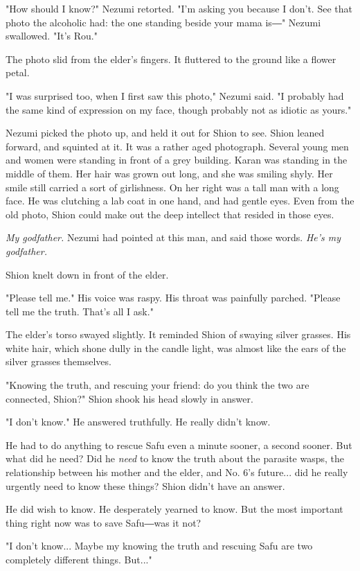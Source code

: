 "How should I know?" Nezumi retorted. "I'm asking you because I don't.
See that photo the alcoholic had: the one standing beside your mama is―"
Nezumi swallowed. "It's Rou."

The photo slid from the elder's fingers. It fluttered to the ground like
a flower petal.

"I was surprised too, when I first saw this photo," Nezumi said. "I
probably had the same kind of expression on my face, though probably not
as idiotic as yours."

Nezumi picked the photo up, and held it out for Shion to see. Shion
leaned forward, and squinted at it. It was a rather aged photograph.
Several young men and women were standing in front of a grey building.
Karan was standing in the middle of them. Her hair was grown out long,
and she was smiling shyly. Her smile still carried a sort of
girlishness. On her right was a tall man with a long face. He was
clutching a lab coat in one hand, and had gentle eyes. Even from the old
photo, Shion could make out the deep intellect that resided in those
eyes.

\emph{My godfather.} Nezumi had pointed at this man, and said those words. \emph{He's
	my godfather.}

Shion knelt down in front of the elder.

"Please tell me." His voice was raspy. His throat was painfully parched.
"Please tell me the truth. That's all I ask."

The elder's torso swayed slightly. It reminded Shion of swaying silver
grasses. His white hair, which shone dully in the candle light, was
almost like the ears of the silver grasses themselves.

"Knowing the truth, and rescuing your friend: do you think the two are
connected, Shion?" Shion shook his head slowly in answer.

"I don't know." He answered truthfully. He really didn't know.

He had to do anything to rescue Safu even a minute sooner, a second
sooner. But what did he need? Did he \emph{need} to know the truth about the
parasite wasps, the relationship between his mother and the elder, and
No. 6's future... did he really urgently need to know these things?
Shion didn't have an answer.

He did wish to know. He desperately yearned to know. But the most
important thing right now was to save Safu―was it not?

"I don't know... Maybe my knowing the truth and rescuing Safu are two
completely different things. But..."

